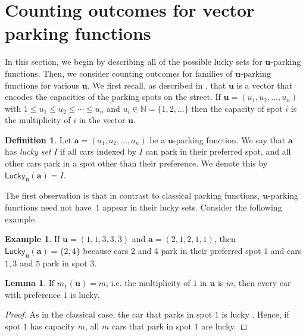 \documentclass[reqno]{amsart}
\newcommand{\Lucky}{\mathsf{Lucky}}
\theoremstyle{definition}
\newtheorem{example}[theorem]{Example}
\newtheorem{lemma}[theorem]{Lemma}
\newtheorem{definition}[theorem]{Definition}
\theoremstyle{remark}
\newcommand{\NN}{\mathbb{N}}
\newcommand{\bsy}{\boldsymbol}
\begin{document}
\section{Counting outcomes for vector parking functions}\label{sec:outcomes for vector pfs}


In this section, we begin by describing all of the possible lucky sets for $\bsy{u}$-parking functions. 
Then, we consider counting outcomes for families of $\bsy{u}$-parking functions for various $\bsy{u}$. We first recall, as described in \cite[pg.\ 4]{2024primevectorparking}, that $\bsy{u}$ is a vector that encodes the capacities of the parking spots on the street. If $\bsy{u}=(u_1,u_2,\ldots,u_n)$ with $1\leq u_1\leq u_2\leq \cdots \leq  u_n $ and $u_i\in \NN=\{1,2,\ldots\}$ then the capacity of spot $i$ is the multiplicity of $i$ in the vector $\bsy{u}$. 



\begin{definition}
Let $\bsy{a}=(a_1,a_2,\ldots,a_{n})$ be a $\bsy{u}$-parking function. We say that $\bsy{a}$ has \emph{lucky set} $I$ if all cars indexed by $I$ can park in their preferred spot, and all other cars park in a spot other than their preference. We denote this by $\Lucky_{\bsy{u}}(\bsy{a})=I$.
\end{definition}

The first observation is that in contrast to classical parking functions, $\bsy{u}$-parking functions need not have~$1$ appear in their lucky sets. Consider the following example.

\begin{example}
If $\bsy{u}=(1,1,3,3,3)$ and $\bsy{a}=(2,1,2,1,1)$, then $\Lucky_{\bsy{u}}(\bsy{a})=\{2,4\}$ because cars $2$ and $4$ park in their preferred spot $1$ and cars $1,3$ and $5$ park in spot $3$.
\end{example}



\begin{lemma}\label{lemma: if spot 1 is available}
If $m_{1}(\bsy{u})=m$, i.e. the multiplicity of $1$ in $\bsy{u}$ is $m$, then every car with preference $1$ is lucky.
\end{lemma}
\begin{proof}
As in the classical case, the car that parks in spot $1$ is lucky \cite[Theorem 2.3]{harrismartinez}. Hence, if spot $1$ has capacity $m$, all $m$ cars that park in spot $1$ are lucky.
\end{proof}
\end{document}
